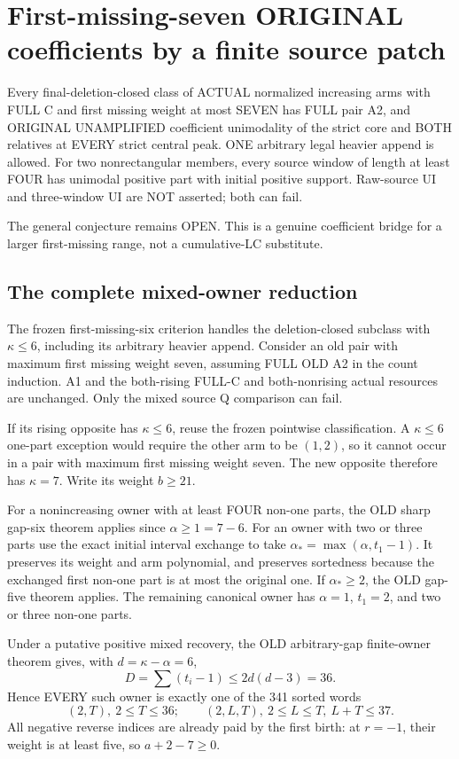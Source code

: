 \section{First-missing-seven ORIGINAL coefficients by a finite source patch}
\begin{theorem}
Every final-deletion-closed class of ACTUAL normalized increasing
arms with FULL C and first missing weight at most SEVEN has FULL
pair A2, and ORIGINAL UNAMPLIFIED coefficient unimodality of the
strict core and BOTH relatives at EVERY strict central peak.
ONE arbitrary legal heavier append is allowed.
For two nonrectangular members, every source window of length
at least FOUR has unimodal positive part with initial positive support.
Raw-source UI and three-window UI are NOT asserted; both can fail.
\end{theorem}
The general conjecture remains OPEN. This is a genuine coefficient
bridge for a larger first-missing range, not a cumulative-LC substitute.

\subsection{The complete mixed-owner reduction}
The frozen first-missing-six criterion handles the deletion-closed
subclass with $\kappa\le6$, including its arbitrary heavier append.
Consider an old pair with maximum first missing weight seven,
assuming FULL OLD A2 in the count induction. A1 and the both-rising
FULL-C and both-nonrising actual resources are unchanged. Only the
mixed source Q comparison can fail.

If its rising opposite has $\kappa\le6$, reuse the frozen pointwise
classification. A $\kappa\le6$ one-part exception would require
the other arm to be $(1,2)$, so it cannot occur in a pair with
maximum first missing weight seven. The new opposite therefore
has $\kappa=7$. Write its weight $b\ge21$.

For a nonincreasing owner with at least FOUR non-one parts, the
OLD sharp gap-six theorem applies since $\alpha\ge1=7-6$.
For an owner with two or three parts use the exact initial interval
exchange to take $\alpha_* =\max(\alpha,t_1-1)$.
It preserves its weight and arm polynomial, and preserves sortedness
because the exchanged first non-one part is at most the original one.
If $\alpha_*\ge2$, the OLD gap-five theorem applies.
The remaining canonical owner has $\alpha=1$, $t_1=2$, and
two or three non-one parts.

Under a putative positive mixed recovery, the OLD arbitrary-gap
finite-owner theorem gives, with $d=\kappa-\alpha=6$,
\[
                     D=\sum(t_i-1)\le2d(d-3)=36.       \tag{1}
\]
Hence EVERY such owner is exactly one of the 341 sorted words
\[
 (2,T),\ 2\le T\le36;\qquad
 (2,L,T),\ 2\le L\le T,\ L+T\le37.
\]
All negative reverse indices are already paid by the first birth:
at $r=-1$, their weight is at least five, so $a+2-7\ge0$.

